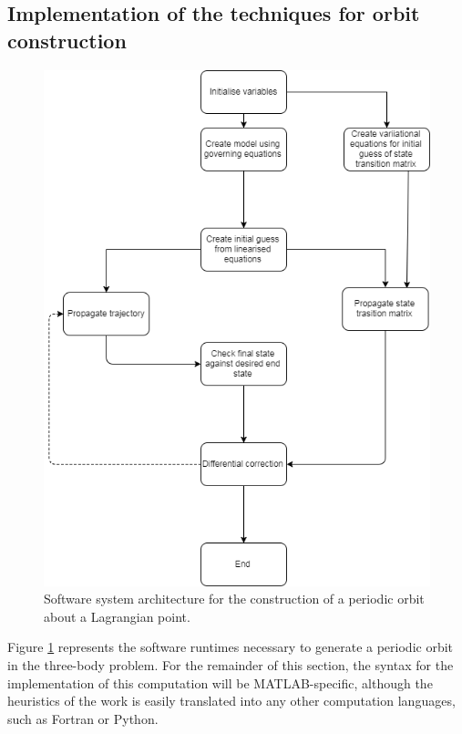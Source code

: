 \subsection{Implementation of the techniques for orbit construction}\label{s:haloorbitcomputation}

\begin{figure}
\centering
\includegraphics[height = .4\textheight]{figures/softwareFlow}
\caption{Software system architecture for the construction of a periodic orbit about a Lagrangian point.}
\label{f:periodicsoftwareflow}
\end{figure}


Figure \ref{f:periodicsoftwareflow} represents the software runtimes necessary to generate a periodic orbit in the three-body problem. For the remainder of this section, the syntax for the implementation of this computation will be MATLAB-specific, although the heuristics of the work is easily translated into any other computation languages, such as Fortran or Python. 


